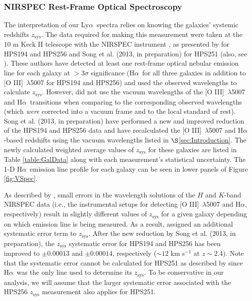 \documentclass{emulateapj}
\newcommand{\lya}{Ly$\alpha$}
\newcommand{\ha}{H$\alpha$}
\newcommand{\oiii}{[O III]}
\begin{document}
\subsubsection{NIRSPEC Rest-Frame Optical Spectroscopy}\label{subsubsec:NIRSPEC}
The interpretation of our \lya\ spectra relies on knowing the galaxies' systemic redshifts $z_{\mathrm{sys}}$. The data required for making this measurement were taken at the 10 m Keck II telescope with the NIRSPEC instrument \citep{mclean1998}, as presented by \citet{finkelstein2011} for HPS194 and HPS256 and Song et al. (2013, in preparation) for HPS251 (also, see \citealp{song2013}). These authors have detected at least one rest-frame optical nebular emission line for each galaxy at $>3\sigma$ significance (\ha\ for all three galaxies in addition to \oiii\ $\lambda$5007 for HPS194 and HPS256) and used the observed wavelengths to calculate $z_{\mathrm{sys}}$. However, \citet{finkelstein2011} did not use the vacuum wavelengths of the \oiii\ $\lambda$5007 and \ha\ transitions when comparing to the corresponding observed wavelengths (which \textit{were} corrected into a vacuum frame and to the local standard of rest). Song et al. (2013, in preparation) have performed a new and improved reduction of the \citet{finkelstein2011} HPS194 and HPS256 data and have recalculated the \oiii\ $\lambda$5007 and \ha-based redshifts using the vacuum wavelengths listed in $\S$\ref{sec:Introduction}. The newly calculated weighted average values of $z_{\mathrm{sys}}$ for these galaxies are listed in Table \ref{table:GalData} along with each measurement's statistical uncertainty. The 1-D \ha\ emission line profile for each galaxy can be seen in lower panels of Figure \ref{fig:VSpec}. 

As described by \citet{finkelstein2011}, small errors in the wavelength solutions of the $H$ and $K$-band NIRSPEC data (i.e., the instrumental setups for detecting \oiii\ $\lambda$5007 and \ha, respectively) result in slightly different values of $z_{\mathrm{sys}}$ for a given galaxy depending on which emission line is being measured. As a result, \citet{finkelstein2011} assigned an additional systematic error term to $z_{\mathrm{sys}}$. After the new reduction by Song et al. (2013, in preparation), the $z_{\mathrm{sys}}$ systematic error for HPS194 and HPS256 has been improved to $\pm0.00013$ and $\pm0.00014$, respectively ($\sim12$ km s$^{-1}$ at $z\sim2.4$). Note that the systematic error cannot be calculated for HPS251 as described by \citet{finkelstein2011} since \ha\ was the only line used to determine its $z_{\mathrm{sys}}$. To be conservative in our analysis, we will assume that the larger systematic error associated with the HPS256 $z_{\mathrm{sys}}$ measurement also applies for HPS251.
\end{document}

